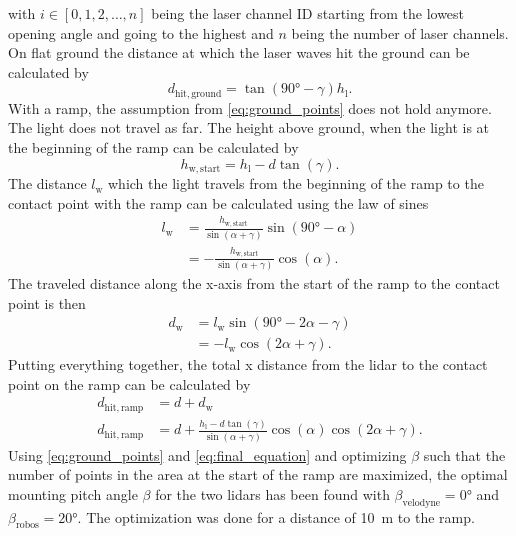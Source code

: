 with $i \in [0,1,2,\dots,n]$ being the laser channel ID starting from the lowest opening angle and going to the highest and $n$ being the number of laser channels.
On flat ground the distance at which the laser waves hit the ground can be calculated by
\begin{equation}
	d_\mathrm{hit,ground}  = \tan(\ang{90} - \gamma) h_\mathrm{l}.
	\label{eq:ground_points}
\end{equation}
With a ramp, the assumption from \cref{eq:ground_points} does not hold anymore.
The light does not travel as far.
The height above ground, when the light is at the beginning of the ramp can be calculated by
\begin{equation}
	h_\mathrm{w,start} = h_\mathrm{l} - d\tan(\gamma).
\end{equation}
The distance $l_\mathrm{w}$ which the light travels from the beginning of the ramp to the contact point with the ramp can be calculated using the law of sines
\begin{align}
	l_\mathrm{w} & = \frac{h_\mathrm{w,start} }{\sin(\alpha + \gamma)} \sin(\ang{90} - \alpha) \nonumber \\
	             & = -\frac{h_\mathrm{w,start} }{\sin(\alpha + \gamma)} \cos(\alpha).
\end{align}
The traveled distance along the x-axis from the start of the ramp to the contact point is then
\begin{align}
	d_\mathrm{w} & = l_\mathrm{w} \sin(\ang{90} - 2\alpha - \gamma) \nonumber \\
	             & = -l_\mathrm{w} \cos(2\alpha + \gamma).
\end{align}
Putting everything together, the total x distance from the \gls{lidar} to the contact point on the ramp can be calculated by
\begin{align}
	d_\mathrm{hit,ramp} & = d + d_\mathrm{w}                                                                                    \nonumber \\
	d_\mathrm{hit,ramp} & = d + \frac{h_\mathrm{l} - d\tan(\gamma)}{\sin(\alpha + \gamma)} \cos(\alpha) \cos(2\alpha + \gamma).
	\label{eq:final_equation}
\end{align}
Using \cref{eq:ground_points} and \cref{eq:final_equation} and optimizing $\beta$ such that the number of points in the area at the start of the ramp are maximized, the optimal mounting pitch angle $\beta$ for the two \glspl{lidar} has been found with $\beta_\mathrm{velodyne} = \ang{0}$ and $\beta_\mathrm{robos} = \ang{20}$.
The optimization was done for a distance of \SI{10}{\metre} to the ramp.
